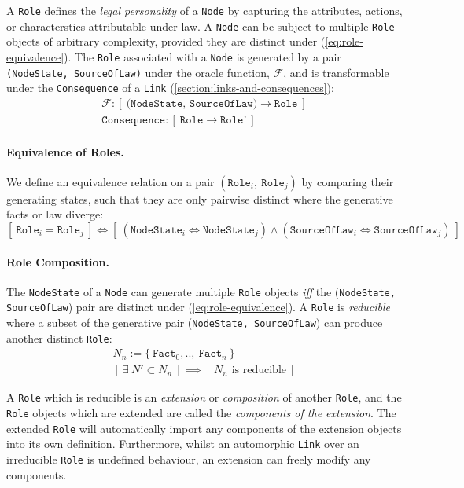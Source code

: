 \documentclass{article}
\numberwithin{equation}{section}
\begin{document}
A \texttt{Role} defines the \textit{legal personality} of a \texttt{Node} by capturing the attributes, actions, or characterstics attributable under law. A \texttt{Node} can be subject to multiple \texttt{Role} objects of arbitrary complexity, provided they are distinct under (\ref{eq:role-equivalence}). The \texttt{Role} associated with a \texttt{Node} is generated by a pair \texttt{(NodeState, SourceOfLaw)} under the oracle function, $\mathcal{F}$, and is transformable under the \texttt{Consequence} of a \texttt{Link} (\ref{section:links-and-consequences}): 
\begin{align}	
	\mathcal{F} : [ \ \texttt{(NodeState, SourceOfLaw)} \rightarrow \texttt{Role} \ ] \\
	\texttt{Consequence} : [ \ \texttt{Role} \rightarrow \texttt{Role'} \ ]
\end{align}

\paragraph{Equivalence of Roles.} We define an equivalence relation on a pair $(\texttt{Role}_i, \ \texttt{Role}_j)$ by comparing their generating states, such that they are only pairwise distinct where the generative facts or law diverge:  
\begin{equation}\label{eq:role-equivalence}
[ \ \texttt{Role}_i = \texttt{Role}_j \ ] \iff [ \ (\texttt{NodeState}_i \iff \texttt{NodeState}_j) \land (\texttt{SourceOfLaw}_i \iff \texttt{SourceOfLaw}_j) \ ]
\end{equation}

\paragraph{Role Composition.} The \texttt{NodeState} of a \texttt{Node} can generate multiple \texttt{Role} objects \textit{iff} the (\texttt{NodeState, SourceOfLaw}) pair are distinct under (\ref{eq:role-equivalence}). A \texttt{Role} is \textit{reducible} where a subset of the generative pair (\texttt{NodeState, SourceOfLaw}) can produce another distinct \texttt{Role}:
\begin{align}
	N_n := \{ \ \texttt{Fact}_0, .., \ \texttt{Fact}_n \ \} \\
	[ \ \exists \ N' \subset N_n \ ] \implies [ \ \text{$N_n$ is reducible} \ ] 
\end{align}

A \texttt{Role} which is reducible is an \textit{extension} or \textit{composition} of another \texttt{Role}, and the \texttt{Role} objects which are extended are called the \textit{components of the extension}. The extended \texttt{Role} will automatically import any components of the extension objects into its own definition. Furthermore, whilst an automorphic \texttt{Link} over an irreducible \texttt{Role} is undefined behaviour, an extension can freely modify any components.
\end{document}
